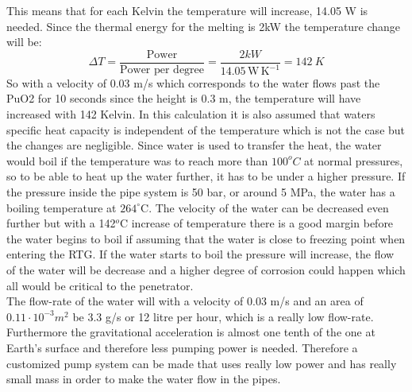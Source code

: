 This means that for each Kelvin the temperature will increase, 14.05 W is needed. Since the thermal energy for the melting is 2kW the temperature change will be: 
\begin{equation}\label{eq:waterheating2}
\Delta T = \frac{\text{Power}}{\text{Power per degree}} = \frac{2kW}{14.05 \, \mathrm{W \, K^{-1}}} = \SI{142}{K}
\end{equation}
So with a velocity of 0.03 m/s which corresponds to the water flows past the PuO2 for 10 seconds since the height is 0.3 m, the temperature will have increased with 142 Kelvin. In this calculation it is also assumed that waters specific heat capacity is independent of the temperature which is not the case but the changes are negligible. Since water is used to transfer the heat, the water would boil if the temperature was to reach more than $100^oC$ at normal pressures, so to be able to heat up the water further, it has to be under a higher pressure. If the pressure inside the pipe system is 50 bar, or around 5 MPa, the water has a boiling temperature at $264^\circ$C. The velocity of the water can be decreased even further but with a 142$^o$C increase of temperature there is a good margin before the water begins to boil if assuming that the water is close to freezing point when entering the RTG. If the water starts to boil the pressure will increase, the flow of the water will be decrease and a higher degree of corrosion could happen which all would be critical to the penetrator. \\

\noindent
The flow-rate of the water will with a velocity of 0.03 m/s and an area of $0.11\cdot 10^{-3} m^2$ be 3.3 g/s or 12 litre per hour, which is a really low flow-rate. Furthermore the gravitational acceleration is almost one tenth of the one at Earth's surface and therefore less pumping power is needed. Therefore a customized pump system can be made that uses really low power and has really small mass in order to make the water flow in the pipes.


